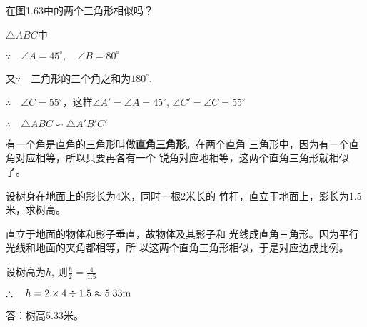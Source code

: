 \begin{example}
	在图1.63中的两个三角形相似吗？
\end{example}

\begin{figure}[htp]
	\centering
{}
	\caption{}
\end{figure}

\begin{solution}
	$\triangle ABC$中

$\because\quad \angle A=45^{\circ},\quad \angle B=80^{\circ}$

又$\because\quad $三角形的三个角之和为$180^{\circ}$, 

$\therefore\quad \angle C=55^{\circ}$，这样$\angle A'=\angle A=45^{\circ}$, $\angle C'=\angle C=55^{\circ}$

$\therefore\quad \triangle ABC\backsim \triangle A'B'C'$
\end{solution}

有一个角是直角的三角形叫做\textbf{直角三角形}。在两个直角
三角形中，因为有一个直角对应相等，所以只要再各有一个
锐角对应地相等，这两个直角三角形就相似了。

\begin{example}
	设树身在地面上的影长为4米，同时一根2米长的
竹杆，直立于地面上，影长为1.5米，求树高。
\end{example}

\begin{solution}
	直立于地面的物体和影子垂直，故物体及其影子和
光线成直角三角形。因为平行光线和地面的夹角都相等，所
以这两个直角三角形相似，于是对应边成比例。

设树高为$h$, 则$\frac{h}{2}=\frac{4}{1.5}$

$\therefore\quad h=2\times4\div 1.5\approx 5.33{\rm m}$

答：树高5.33米。
\end{solution}


